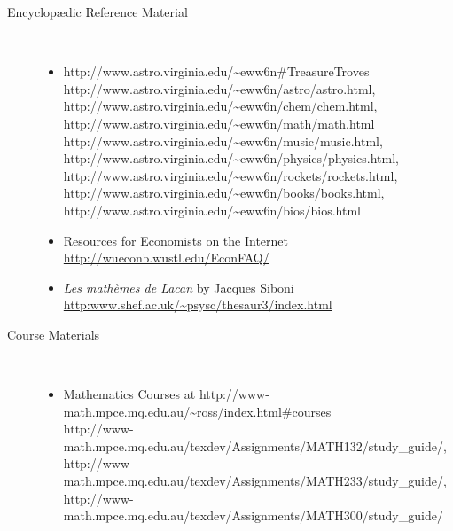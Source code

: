 \begin{description}
\begin{itemize}
%

\end{itemize}


\htmlrule[50\% center]

\item[Encyclop\ae{}dic Reference Material]~%
\begin{itemize}
\item
{}%
{http://www.astro.virginia.edu/\~{}eww6n\#TreasureTroves} 
%
{http://www.astro.virginia.edu/\~{}eww6n/astro/astro.html}, 
%
{http://www.astro.virginia.edu/\~{}eww6n/chem/chem.html}, 
%
{http://www.astro.virginia.edu/\~{}eww6n/math/math.html}\\ 
%
{http://www.astro.virginia.edu/\~{}eww6n/music/music.html}, 
%
{http://www.astro.virginia.edu/\~{}eww6n/physics/physics.html}, 
%
{http://www.astro.virginia.edu/\~{}eww6n/rockets/rockets.html}, 
%
{http://www.astro.virginia.edu/\~{}eww6n/books/books.html}, 
%
{http://www.astro.virginia.edu/\~{}eww6n/bios/bios.html}
\html{\smallskip}

\item
Resources for Economists on the Internet\\
\url{http://wueconb.wustl.edu/EconFAQ/}
\html{\smallskip}

\item
\textit{Les math{\`e}mes de Lacan} by Jacques Siboni\\
\url{http:www.shef.ac.uk/~psysc/thesaur3/index.html}
\html{\smallskip}

\end{itemize}

\htmlrule[50\% center]


\item[Course Materials]~%
\begin{itemize}
\item
Mathematics Courses at %
{http://www-math.mpce.mq.edu.au/\~{}ross/index.html\#courses}\\
%
{http://www-math.mpce.mq.edu.au/texdev/Assignments/MATH132/study_guide/}, 
%
{http://www-math.mpce.mq.edu.au/texdev/Assignments/MATH233/study_guide/}, 
%
{http://www-math.mpce.mq.edu.au/texdev/Assignments/MATH300/study_guide/}
\html{\smallskip}


\end{itemize}
\end{description}
